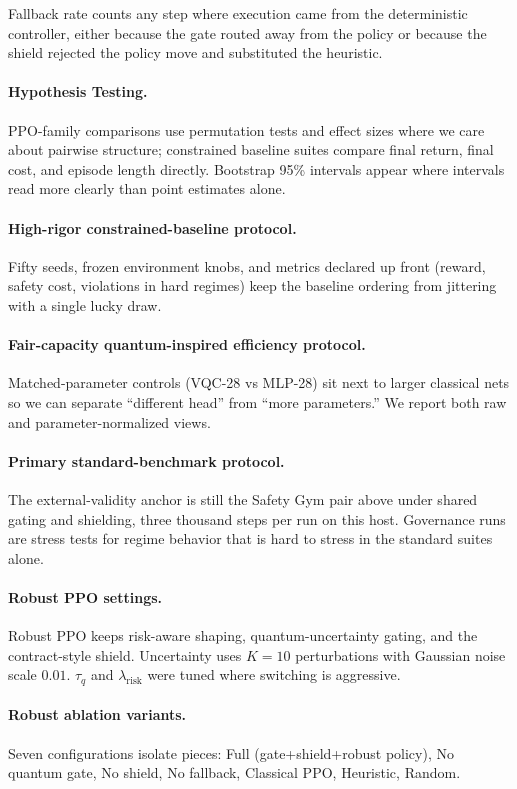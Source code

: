 Fallback rate counts any step where execution came from the deterministic controller, either because the gate routed away from the policy or because the shield rejected the policy move and substituted the heuristic.

\paragraph{Hypothesis Testing.}
PPO-family comparisons use permutation tests and effect sizes where we care about pairwise structure; constrained baseline suites compare final return, final cost, and episode length directly. Bootstrap 95\% intervals appear where intervals read more clearly than point estimates alone.

\paragraph{High-rigor constrained-baseline protocol.}
Fifty seeds, frozen environment knobs, and metrics declared up front (reward, safety cost, violations in hard regimes) keep the baseline ordering from jittering with a single lucky draw.

\paragraph{Fair-capacity quantum-inspired efficiency protocol.}
Matched-parameter controls (VQC-28 vs MLP-28) sit next to larger classical nets so we can separate ``different head'' from ``more parameters.'' We report both raw and parameter-normalized views.

\paragraph{Primary standard-benchmark protocol.}
The external-validity anchor is still the Safety Gym pair above under shared gating and shielding, three thousand steps per run on this host. Governance runs are stress tests for regime behavior that is hard to stress in the standard suites alone.

\paragraph{Robust PPO settings.}
Robust PPO keeps risk-aware shaping, quantum-uncertainty gating, and the contract-style shield. Uncertainty uses $K=10$ perturbations with Gaussian noise scale $0.01$. $\tau_q$ and $\lambda_{\mathrm{risk}}$ were tuned where switching is aggressive.

\paragraph{Robust ablation variants.}
Seven configurations isolate pieces: Full (gate+shield+robust policy), No quantum gate, No shield, No fallback, Classical PPO, Heuristic, Random.
